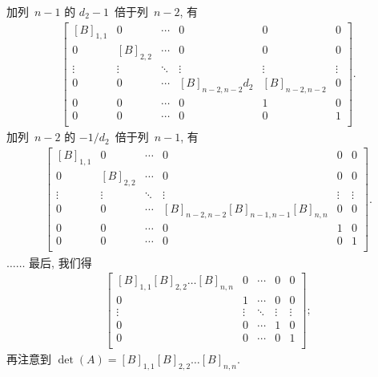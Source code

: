 加列~\(n-1\) 的 \(d_2 - 1\)~倍于列~\(n-2\), 有
\begin{align*}
    \begin{bmatrix}
        [B]_{1,1} & 0         & \cdots & 0                 & 0             & 0      \\
        0         & [B]_{2,2} & \cdots & 0                 & 0             & 0      \\
        \vdots    & \vdots    & \ddots & \vdots            & \vdots        & \vdots \\
        0         & 0         & \cdots & [B]_{n-2,n-2} d_2 & [B]_{n-2,n-2} & 0      \\
        0         & 0         & \cdots & 0                 & 1             & 0      \\
        0         & 0         & \cdots & 0                 & 0             & 1      \\
    \end{bmatrix}.
\end{align*}
加列~\(n-2\) 的 \(-1/d_2\)~倍于列~\(n-1\), 有
\begin{align*}
    \begin{bmatrix}
        [B]_{1,1} & 0         & \cdots & 0                                     & 0      & 0      \\
        0         & [B]_{2,2} & \cdots & 0                                     & 0      & 0      \\
        \vdots    & \vdots    & \ddots & \vdots                                & \vdots & \vdots \\
        0         & 0         & \cdots & [B]_{n-2,n-2} [B]_{n-1,n-1} [B]_{n,n} & 0      & 0      \\
        0         & 0         & \cdots & 0                                     & 1      & 0      \\
        0         & 0         & \cdots & 0                                     & 0      & 1      \\
    \end{bmatrix}.
\end{align*}
\(\dots \dots\)
最后, 我们得
\begin{align*}
    \begin{bmatrix}
        [B]_{1,1} [B]_{2,2} \dots [B]_{n,n} & 0      & \cdots & 0      & 0      \\
        0                                   & 1      & \cdots & 0      & 0      \\
        \vdots                              & \vdots & \ddots & \vdots & \vdots \\
        0                                   & 0      & \cdots & 1      & 0      \\
        0                                   & 0      & \cdots & 0      & 1      \\
    \end{bmatrix};
\end{align*}
再注意到
\(\det {(A)} = [B]_{1,1} [B]_{2,2} \dots [B]_{n,n}\).


